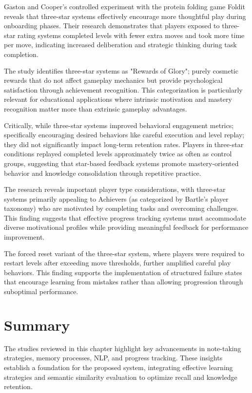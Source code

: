 {\color{maroon}
Gaston and Cooper's controlled experiment with the protein folding game Foldit reveals that three-star systems effectively encourage more thoughtful play during onboarding phases. Their research demonstrates that players exposed to three-star rating systems completed levels with fewer extra moves and took more time per move, indicating increased deliberation and strategic thinking during task completion.

The study identifies three-star systems as "Rewards of Glory"; purely cosmetic rewards that do not affect gameplay mechanics but provide psychological satisfaction through achievement recognition. This categorization is particularly relevant for educational applications where intrinsic motivation and mastery recognition matter more than extrinsic gameplay advantages.

Critically, while three-star systems improved behavioral engagement metrics; specifically encouraging desired behaviors like careful execution and level replay; they did not significantly impact long-term retention rates. Players in three-star conditions replayed completed levels approximately twice as often as control groups, suggesting that star-based feedback systems promote mastery-oriented behavior and knowledge consolidation through repetitive practice.

The research reveals important player type considerations, with three-star systems primarily appealing to Achievers (as categorized by Bartle's player taxonomy) who are motivated by completing tasks and overcoming challenges. This finding suggests that effective progress tracking systems must accommodate diverse motivational profiles while providing meaningful feedback for performance improvement.

The forced reset variant of the three-star system, where players were required to restart levels after exceeding move thresholds, further amplified careful play behaviors. This finding supports the implementation of structured failure states that encourage learning from mistakes rather than allowing progression through suboptimal performance.
}

\section{Summary}

The studies reviewed in this chapter highlight key advancements in note-taking strategies, memory processes, NLP, and progress tracking. These insights establish a foundation for the proposed system, integrating effective learning strategies and semantic similarity evaluation to optimize recall and knowledge retention.

